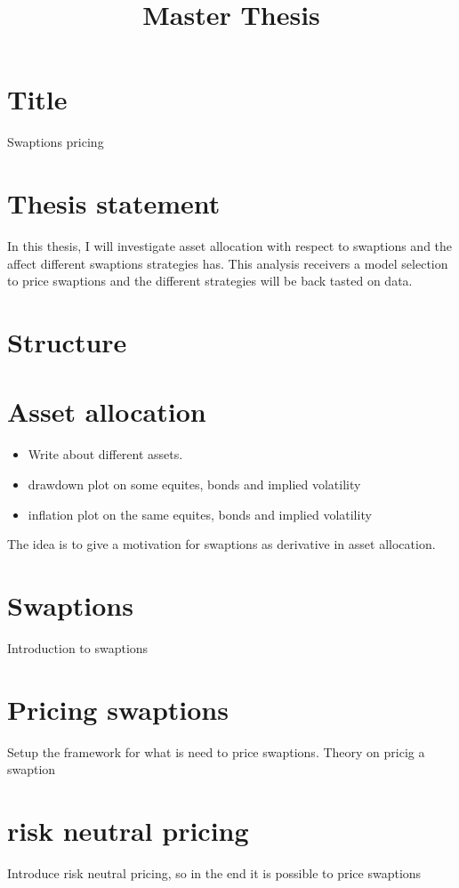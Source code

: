 \documentclass{article}
\title{Master Thesis}
\author{}
\begin{document}
\maketitle
\tableofcontents
\newpage

\section*{Title}
Swaptions pricing 

\section*{Thesis statement}
In this thesis, I will investigate asset allocation with respect to swaptions and the affect different swaptions strategies has.
This analysis receivers a model selection to price swaptions and the different strategies will be back tasted on data.

\section*{Structure}

\section{Asset allocation}
\begin{itemize}
  \item Write about different assets.
  \item drawdown plot on some equites, bonds and implied volatility
  \item inflation plot on the same equites, bonds and implied volatility
\end{itemize}  
The idea is to give a motivation for swaptions as derivative in asset allocation. 
 

\section{Swaptions}
Introduction to swaptions

\section{Pricing swaptions}
Setup the framework for what is need to price swaptions.
Theory on pricig a swaption 

\section{risk neutral pricing}
Introduce risk neutral pricing, so in the end it is possible to price swaptions
\end{document}
